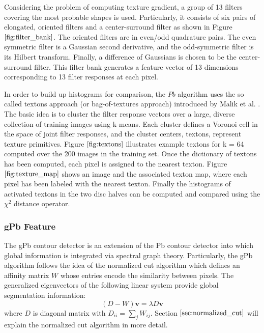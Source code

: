 \documentclass{SMBV12}
\begin{document}
Considering the problem of computing texture gradient, a group of 13 filters covering the most probable shapes is used. Particularly, it consists of six pairs of elongated, oriented filters and a center-surround filter as shown in Figure $\ref{fig:filter_bank}$. The oriented filters are in even/odd quadrature pairs. The even symmetric filter is a Gaussian second derivative, and the odd-symmetric filter is its Hilbert transform. Finally, a difference of Gaussians is chosen to be the center-surround filter. This filter bank generates a feature vector of 13 dimensions corresponding to 13 filter responses at each pixel.

In order to build up histograms for comparison, the $Pb$ algorithm uses the so called textons approach (or bag-of-textures approach) introduced by Malik et al. \cite{malik2001contour}. The basic idea is to cluster the filter response vectors over a large, diverse collection of training images using k-means. Each cluster defines a Voronoi cell in the space of joint filter responses, and the cluster centers, textons, represent texture primitives. Figure $\ref{fig:textons}$ illustrates example textons for k = 64 computed over the 200 images in the training set. Once the dictionary of textons has been computed, each pixel is assigned to the nearest texton. Figure $\ref{fig:texture_map}$ shows an image and the associated texton map, where each pixel has been labeled with the nearest texton. Finally the histograms of activated textons in the two disc halves can be computed and compared using the $\chi^2$ distance operator.

\subsubsection{gPb Feature}

The gPb contour detector \cite{maire2008using} is an extension of the Pb contour detector into which global information is integrated via spectral graph theory. Particularly, the gPb algorithm follows the idea of the normalized cut algorithm which defines an affinity matrix $W$ whose entries encode the similarity between pixels. The generalized eigenvectors of the following linear system provide global segmentation information:
\begin{equation}
(D-W)\mathbf{v} = \lambda D \mathbf{v}
\label{eq:ncut}
\end{equation}
where $D$ is diagonal matrix with $D_{ii} = \sum_j W_{ij}$.
Section $\ref{sec:normalized_cut}$ will explain the normalized cut algorithm in more detail.
\end{document}
